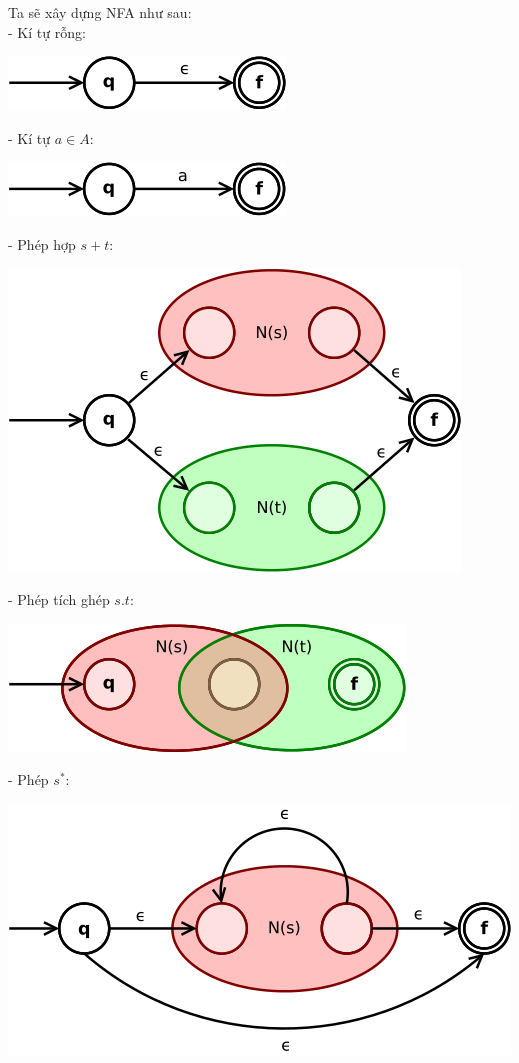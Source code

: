 \documentclass[14pt]{extreport}
\begin{document}
Ta sẽ xây dựng NFA như sau:\\
- Kí tự rỗng:
\begin{center}
\includegraphics[scale=0.7]{empty.png}
\end{center}
- Kí tự $a \in A$:
\begin{center}
\includegraphics[scale=0.7]{symbol.png}
\end{center}
- Phép hợp $s+t$:
\begin{center}
\includegraphics[scale=0.6]{union.png}
\end{center}
- Phép tích ghép $s.t$:
\begin{center}
\includegraphics[scale=0.6]{concac.png}
\end{center}
- Phép $s^*$:
\begin{center}
\includegraphics[scale=0.6]{star.png}
\end{center}
\end{document}
